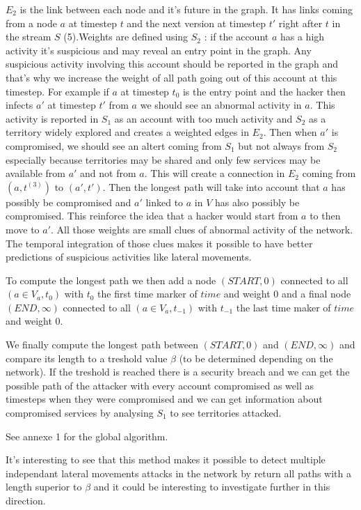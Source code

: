 \documentclass[11pt]{article}
\begin{document}
$E_2$ is the link between each node and it's future in the graph. It has links coming from a node $a$ at timestep $t$ and the next version at timestep $t'$ right after $t$ in the stream $S$ (5).Weights are defined using $S_2$ : if the account $a$ has a high activity it's suspicious and may reveal an entry point in the graph. Any suspicious activity involving this account should be reported in the graph and that's why we increase the weight of all path going out of this account at this timestep. For example if $a$ at timestep $t_0$ is the entry point and the hacker then infects $a'$ at timestep $t'$ from $a$ we should see an abnormal activity in $a$. This activity is reported in $S_1$ as an account with too much activity and $S_2$ as a territory widely explored and creates a weighted edges in $E_2$. Then when $a'$ is compromised, we should see an altert coming from $S_1$ but not always from $S_2$ especially because territories may be shared and only few services may be available from $a'$ and not from $a$. This will create a connection in $E_2$ coming from $(a,t^{(3)})$ to $(a',t')$. Then the longest path will take into account that $a$ has possibly be compromised and $a'$ linked to $a$ in $V$ has also possibly be compromised. This reinforce the idea that a hacker would start from $a$ to then move to $a'$. All those weights are small clues of abnormal activity of the network. The temporal integration of those clues makes it possible to have better predictions of suspicious activities like lateral movements.

To compute the longest path we then add a node $(START,0)$ connected to all $(a\in V_a,t_0)$ with $t_0$ the first time marker of $time$ and weight 0 and a final node $(END,\infty)$ connected to all $(a\in V_a,t_{-1})$ with $t_{-1}$ the last time maker of $time$ and weight 0. 

We finally compute the longest path between $(START,0)$ and $(END,\infty)$ and compare its length to a treshold value $\beta$ (to be determined depending on the network). If the treshold is reached there is a security breach and we can get the possible path of the attacker with every account compromised as well as timesteps when they were compromised and we can get information about compromised services by analysing $S_1$ to see territories attacked.

See annexe 1 for the global algorithm.

It's interesting to see that this method makes it possible to detect multiple independant lateral movements attacks in the network by return all paths with a length superior to $\beta$ and it could be interesting to investigate further in this direction.
\end{document}
